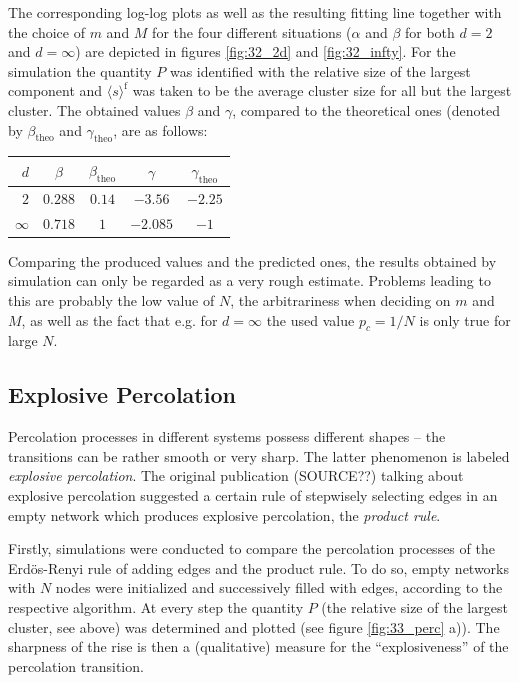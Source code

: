 \documentclass{scrartcl}
\begin{document}
The corresponding log-log plots as well as the resulting fitting line
together with the choice of $m$ and $M$ for the four different situations
($\alpha$ and $\beta$ for both $d=2$ and $d=\infty$) are depicted in
figures \ref{fig:32_2d} and \ref{fig:32_infty}. For the simulation the
quantity $P$ was identified with the relative size of the largest component
and $\langle s\rangle^\mathrm{f}$ was taken to be the average cluster size
for all but the largest cluster. The obtained values $\beta$ and $\gamma$,
compared to the theoretical ones (denoted by $\beta_\mathrm{theo}$ and
$\gamma_\mathrm{theo}$, are as follows:

\begin{center}
    \begin{tabular}{r@{\qquad\qquad}c@{\quad}c@{\qquad\quad}c@{\quad}c}
    $d$ & $\beta$ & $\beta_\mathrm{theo}$ & $\gamma$ & $\gamma_\mathrm{theo}$ \\
    \hline
    $2$ & $0.288$ & $0.14$ & $-3.56$ & $-2.25$   \\
    $\infty$ & $0.718$ & $1$ & $-2.085$ & $-1$ \\
\end{tabular}
\end{center}

Comparing the produced values and the predicted ones, the results obtained
by simulation can only be regarded as a very rough estimate. Problems
leading to this are probably the low value of $N$, the arbitrariness when
deciding on $m$ and $M$, as well as the fact that e.g. for $d=\infty$ the used
value $p_c=1/N$ is only true for large $N$.


\subsection{Explosive Percolation}
Percolation processes in different systems possess different shapes -- the
transitions can be rather smooth or very sharp. The latter phenomenon is
labeled \emph{explosive percolation}. The original publication (SOURCE??)
talking about explosive percolation suggested a certain rule of stepwisely
selecting edges in an empty network which produces explosive percolation,
the \emph{product rule}.

 Firstly, simulations were conducted to compare the
percolation processes of the Erdös-Renyi rule of adding edges and the
product rule. To do so, empty networks with $N$ nodes were initialized and
successively filled with edges, according to the respective algorithm. At
every step the quantity $P$ (the relative size of the largest cluster, see
above) was determined and plotted (see figure \ref{fig:33_perc} a)). The
sharpness of the rise is then a (qualitative) measure for the
\enquote{explosiveness} of the percolation transition.
\end{document}
